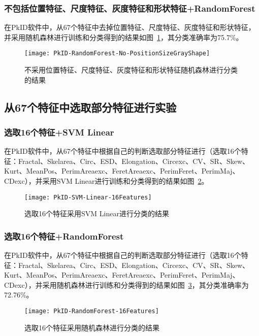 \subsubsection{不包括位置特征、尺度特征、灰度特征和形状特征+RandomForest}
在PkID软件中，从67个特征中去掉位置特征、尺度特征、灰度特征和形状特征，并采用随机森林进行训练和分类得到的结果如图~\ref{fig:PkID-RandomForest-No-PositionSizeGrayShape}，其分类准确率为75.7\%。

\begin{figure}[!ht]
\centering
\texttt{[image: PkID-RandomForest-No-PositionSizeGrayShape]}
\caption{不采用位置特征、尺度特征、灰度特征和形状特征随机森林进行分类的结果}
\label{fig:PkID-RandomForest-No-PositionSizeGrayShape}
\end{figure}

\subsection{从67个特征中选取部分特征进行实验}
\subsubsection{选取16个特征+SVM Linear}
在PkID软件中，从67个特征中根据自己的判断选取部分特征进行（选取16个特征：Fractal、Skelarea、Circ、ESD、Elongation、Circexc、CV、SR、Skew、Kurt、MeanPos、PerimAreaexc、FeretAreaexc、PerimFeret、PerimMaj、CDexc），并采用SVM Linear进行训练和分类得到的结果如图~\ref{fig:PkID-SVM-Linear-16Features}。

\begin{figure}[!ht]
\centering
\texttt{[image: PkID-SVM-Linear-16Features]}
\caption{选取16个特征采用SVM Linear进行分类的结果}
\label{fig:PkID-SVM-Linear-16Features}
\end{figure}

\subsubsection{选取16个特征+RandomForest}
在PkID软件中，从67个特征中根据自己的判断选取部分特征进行（选取16个特征：Fractal、Skelarea、Circ、ESD、Elongation、Circexc、CV、SR、Skew、Kurt、MeanPos、PerimAreaexc、FeretAreaexc、PerimFeret、PerimMaj、CDexc），并采用随机森林进行训练和分类得到的结果如图~\ref{fig:PkID-RandomForest-16Features}，其分类准确率为72.76\%。

\begin{figure}[!ht]
\centering
\texttt{[image: PkID-RandomForest-16Features]}
\caption{选取16个特征采用随机森林进行分类的结果}
\label{fig:PkID-RandomForest-16Features}
\end{figure}

